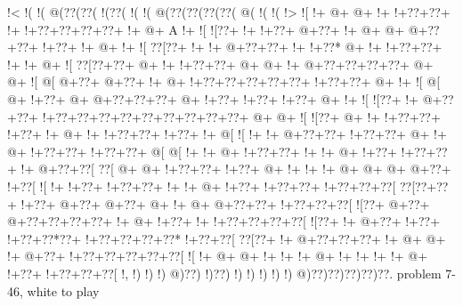 \vbox{\vbox{\goo
\- !<\- !(\- !(\- @(\0??(\0??(\- !(\0??(\- !(\- !(\- @(\0??(\0??(\0??(\0??(\- @(\- !(\- !(\- !>
\- ![\- !+\- @+\- @+\- !+\- !+\0??+\0??+\- !+\- !+\0??+\0??+\0??+\0??+\- !+\- @+\!  A\- !+\- ![
\- ![\0??+\- !+\- !+\0??+\- @+\0??+\- !+\- @+\- @+\- @+\0??+\0??+\- !+\0??+\- !+\- @+\- !+\- ![
\0??[\0??+\- !+\- !+\- @+\0??+\0??+\- !+\- !+\0??*\- @+\- !+\- !+\0??+\0??+\- !+\- !+\- @+\- ![
\0??[\0??+\0??+\- @+\- !+\- !+\0??+\0??+\- @+\- @+\- !+\- @+\0??+\0??+\0??+\0??+\- @+\- @+\- ![
\- @[\- @+\0??+\- @+\0??+\- !+\- @+\- !+\0??+\0??+\0??+\0??+\0??+\- !+\0??+\0??+\- @+\- !+\- ![
\- @[\- @+\- !+\0??+\- @+\- @+\0??+\0??+\0??+\- @+\- !+\0??+\- !+\0??+\- !+\0??+\- @+\- !+\- ![
\- ![\0??+\- !+\- @+\0??+\0??+\- !+\0??+\0??+\0??+\0??+\0??+\0??+\0??+\0??+\0??+\- @+\- @+\- ![
\- ![\0??+\- @+\- !+\- !+\0??+\0??+\- !+\0??+\- !+\- @+\- !+\- !+\0??+\0??+\- !+\0??+\- !+\- @[
\- ![\- !+\- !+\- @+\0??+\0??+\- !+\0??+\0??+\- @+\- !+\- @+\- !+\0??+\0??+\- !+\0??+\0??+\- @[
\- @[\- !+\- !+\- @+\- !+\0??+\0??+\- !+\- !+\- @+\- !+\0??+\- !+\0??+\0??+\- !+\- @+\0??+\0??[
\0??[\- @+\- @+\- !+\0??+\0??+\- !+\0??+\- @+\- !+\- !+\- !+\- @+\- @+\- @+\- @+\0??+\- !+\0??[
\- ![\- !+\- !+\0??+\- !+\0??+\0??+\- !+\- !+\- @+\- !+\0??+\- !+\0??+\0??+\- !+\0??+\0??+\0??[
\0??[\0??+\0??+\- !+\0??+\- @+\0??+\- @+\0??+\- @+\- !+\- @+\- @+\0??+\0??+\- !+\0??+\0??+\0??[
\- ![\0??+\- @+\0??+\- @+\0??+\0??+\0??+\0??+\- !+\- @+\- !+\0??+\- !+\- !+\0??+\0??+\0??+\0??[
\- ![\0??+\- !+\- @+\0??+\- !+\0??+\- !+\0??+\0??*\0??+\- !+\0??+\0??+\0??+\0??*\- !+\0??+\0??[
\0??[\0??+\- !+\- @+\0??+\0??+\0??+\- !+\- @+\- @+\- !+\- @+\0??+\- !+\0??+\0??+\0??+\0??+\0??[
\- ![\- !+\- @+\- @+\- !+\- !+\- !+\- @+\- !+\- !+\- !+\- !+\- @+\- !+\0??+\- !+\0??+\0??+\0??[
\- !,\- !)\- !)\- !)\- @)\0??)\- !)\0??)\- !)\- !)\- !)\- !)\- !)\- @)\0??)\0??)\0??)\0??)\0??.
}
\hfil problem 7-46, white to play\hfil\break
}
